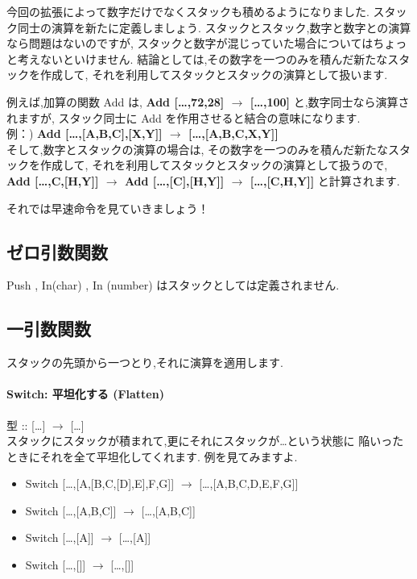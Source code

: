 今回の拡張によって数字だけでなくスタックも積めるようになりました.
スタック同士の演算を新たに定義しましょう.
スタックとスタック,数字と数字との演算なら問題はないのですが,
スタックと数字が混じっていた場合についてはちょっと考えないといけません.
結論としては,その数字を一つのみを積んだ新たなスタックを作成して,
それを利用してスタックとスタックの演算として扱います.

例えば,加算の関数 Add は, \textbf{Add {[}\ldots{},72,28{]}
$\to$ {[}\ldots{},100{]}} と,数字同士なら演算されますが,
スタック同士に Add を作用させると結合の意味になります.\\例：) \textbf{Add
{[}\ldots{},{[}A,B,C{]},{[}X,Y{]}{]} $\to$
{[}\ldots{},{[}A,B,C,X,Y{]}{]}}\\そして,数字とスタックの演算の場合は,
その数字を一つのみを積んだ新たなスタックを作成して,
それを利用してスタックとスタックの演算として扱うので, \textbf{Add
{[}\ldots{},C,{[}H,Y{]}{]} $\to$ Add
{[}\ldots{},{[}C{]},{[}H,Y{]}{]} $\to$
{[}\ldots{},{[}C,H,Y{]}{]}} と計算されます.

それでは早速命令を見ていきましょう！

\subsection{ゼロ引数関数}

Push , In(char) , In (number) はスタックとしては定義されません.

\subsection{一引数関数}

スタックの先頭から一つとり,それに演算を適用します.

\paragraph{Switch: 平坦化する (Flatten)}

型 :: {[}\ldots{}{]} $\to$
{[}\ldots{}{]}\\スタックにスタックが積まれて,更にそれにスタックが\ldots{}という状態に
陥いったときにそれを全て平坦化してくれます. 例を見てみますよ.

\begin{itemize}
\item
  Switch {[}\ldots{},{[}A,{[}B,C,{[}D{]},E{]},F,G{]}{]} $\to$
  {[}\ldots{},{[}A,B,C,D,E,F,G{]}{]}
\item
  Switch {[}\ldots{},{[}A,B,C{]}{]} $\to$
  {[}\ldots{},{[}A,B,C{]}{]}
\item
  Switch {[}\ldots{},{[}A{]}{]} $\to$ {[}\ldots{},{[}A{]}{]}
\item
  Switch {[}\ldots{},{[}{]}{]} $\to$ {[}\ldots{},{[}{]}{]}
\end{itemize}

